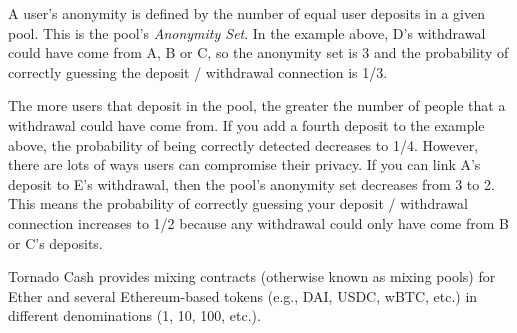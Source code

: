 A user's anonymity is defined by the number of equal user deposits in a given pool. This is the pool's \emph{Anonymity Set}. In the example above, D’s withdrawal could have come from A, B or C, so the anonymity set is 3 and the probability of correctly guessing the deposit / withdrawal connection is 1/3.

The more users that deposit in the pool, the greater the number of people that a withdrawal could have come from. If you add a fourth deposit to the example above, the probability of being correctly detected decreases to 1/4.
However, there are lots of ways users can compromise their privacy. If you can link A’s deposit to E’s withdrawal, then the pool’s anonymity set decreases from 3 to 2. This means the probability of correctly guessing your deposit / withdrawal connection increases to 1/2 because any withdrawal could only have come from B or C’s deposits.

Tornado Cash provides mixing contracts (otherwise known as mixing pools) for Ether and several Ethereum-based tokens (e.g., DAI, USDC, wBTC, etc.) in different denominations (1, 10, 100, etc.).
